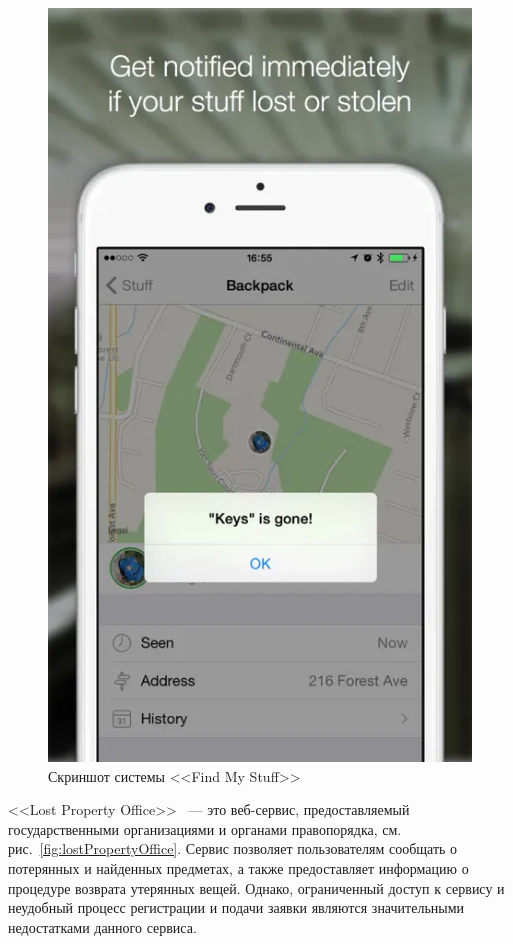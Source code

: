 \begin{figure}[htb]
	\centering
	\includegraphics[height=.4\textheight]{images/findMyStuff2.png}
	\parskip=6pt
	\caption{Скриншот системы <<Find My Stuff>>}
	\label{fig:findMyStuff2}
\end{figure}

<<Lost Property Office>>~\cite{bib:parliament_lost_and_found} --- это веб-сервис, предоставляемый государственными организациями и органами правопорядка, см. рис.~\ref{fig:lostPropertyOffice}. Сервис позволяет пользователям сообщать о потерянных и найденных предметах, а также предоставляет информацию о процедуре возврата утерянных вещей. Однако, ограниченный доступ к сервису и неудобный процесс регистрации и подачи заявки являются значительными недостатками данного сервиса.

